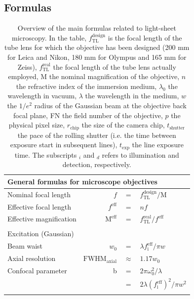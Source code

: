 \documentclass[12pt]{spieman}  %
\begin{document}
\subsection{Formulas}
\begin{table}[t!]
	\centering
		\caption[Main formulas]{Overview of the main formulas related to light-sheet microscopy. In the table, $f_{\text{TL}}^{\text{design}}$ is the focal length of the tube lens for which the objective has been designed (200 mm for Leica and Nikon, 180 mm for Olympus and 165 mm for Zeiss), $f_{\text{TL}}^{\text{real}}$ the focal length of the tube lens actually employed, $\text{M}$ the nominal magnification of the objective, $n$ the refractive index of the immersion medium, $\lambda_0$ the wavelength in vacuum, $\lambda$ the wavelength in the medium, $w$ the $1/e^2$ radius of the Gaussian beam at the objective back focal plane, FN the field number of the objective, $p$ the physical pixel size, $r_{\text{chip}}$ the size of the camera chip, $t_{\text{shutter}}$ the pace of the rolling shutter (i.e. the time between exposure start in subsequent lines), $ t_{\text{exp}}$ the line exposure time. The subscripts $_i$ and $_d$ refers to illumination and detection, respectively. \label{tab:resolution}}
		\begin{tabular}{lrcl}
		\\
		\multicolumn{4}{l}{General formulas for microscope objectives}\\\hline\hline 
		Nominal focal length							& $f$ 													& $=$					& $f_{\text{TL}}^{\text{design}}/\text{M}$				\\	
		Effective focal length						& $f^{\text{eff}}$							& $=$					& $nf$													\\
		Effective magnification						& $\text{M}^{\text{eff}}$				& $=$					& $f_{\text{TL}}^{\text{real}}/f^{\text{eff}}$			\\\\
		\multicolumn{4}{l}{Excitation (Gaussian)}\\\hline\hline	
		Beam waist												&$w_0$													& $=$ 				& $ \lambda f_{\text{i}}^{\text{eff}} / \pi w$				\\
		Axial resolution									&$\text{FWHM}_{\text{axial}}$		& $\approx$   & $ 1.17 w_0 $											\\
		Confocal parameter								& b															& $=$  				& $2 \pi \omega_0^2 / \lambda$							\\
																			&  															& $=$   			& $2 \lambda {(f_{\text{i}}^{\text{eff}})}^2 / \pi w^2 $	\\\\

\end{tabular}
\end{table}
\end{document}
